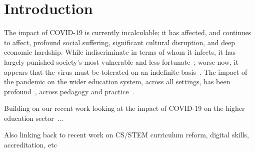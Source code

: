 \documentclass[sigconf]{acmart}
\begin{document}


\maketitle

\section{Introduction}\label{intro}

The impact of COVID-19 is currently incalculable; it has affected, and
continues to affect, profound social suffering, significant cultural
disruption, and deep economic hardship. While indiscriminate in terms
of whom it infects, it has largely punished society’s most vulnerable
and less fortunate~\cite{vonbraun-et-al:2020,lancetcovid:2020}; worse
now, it appears that the virus must be tolerated on an indefinite
basis~\cite{kissler-et-al:2020}. The impact of the pandemic on the
wider education system, across all settings, has been
profound~\cite{unescocovidedu:2020,armitage+nellums:2020}, across
pedagogy and practice~\cite{means:2014,doucet-et-al:2020}.

Building on our recent work looking at the impact of COVID-19 on the higher
education sector~\cite{watermeyer-et-al:he2020}...


Also linking back to recent work on CS/STEM curriculum reform, digital
skills, accreditation,
etc~\cite{brown-et-al-toce2014,davenport-et-al:latice2016,murphy-et-al:programming2017,tryfonas+crick:petra2018,crick-et-al:fie2019,davenport-et-al:educon2020,prickett-et-al:iticse2020}
\end{document}
